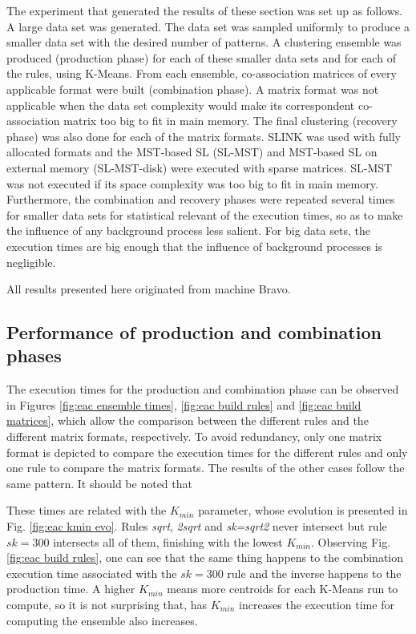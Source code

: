 The experiment that generated the results of these section was set up as follows.
A large data set was generated.
The data set was sampled uniformly to produce a smaller data set with the desired number of patterns.
A clustering ensemble was produced (production phase) for each of these smaller data sets and for each of the rules, using K-Means.
From each ensemble, co-association matrices of every applicable format were built (combination phase).
A matrix format was not applicable when the data set complexity would make its correspondent co-association matrix too big to fit in main memory.
The final clustering (recovery phase) was also done for each of the matrix formats.
SLINK was used with fully allocated formats and the MST-based SL (SL-MST) and MST-based SL on external memory (SL-MST-disk) were executed with sparse matrices.
SL-MST was not executed if its space complexity was too big to fit in main memory.
Furthermore, the combination and recovery phases were repeated several times for smaller data sets for statistical relevant of the execution times, so as to make the influence of any background process less salient.
For big data sets, the execution times are big enough that the influence of background processes is negligible.

All results presented here originated from machine Bravo.

\subsection{Performance of production and combination phases}

The execution times for the production and combination phase can be observed in Figures \ref{fig:eac ensemble times}, \ref{fig:eac build rules} and \ref{fig:eac build matrices}, which allow the comparison between the different rules and the different matrix formats, respectively.
To avoid redundancy, only one matrix format is depicted to compare the execution times for the different rules and only one rule to compare the matrix formats.
The results of the other cases follow the same pattern.
It should be noted that 

These times are related with the $K_{min}$ parameter, whose evolution is presented in Fig. \ref{fig:eac kmin evo}.
Rules \emph{sqrt}, \emph{2sqrt} and \emph{sk=sqrt2} never intersect but rule $sk=300$ intersects all of them, finishing with the lowest $K_{min}$.
Observing Fig. \ref{fig:eac build rules}, one can see that the same thing happens to the combination execution time associated with the $sk=300$ rule and the inverse happens to the production time.
A higher $K_{min}$ means more centroids for each K-Means run to compute, so it is not surprising that, has $K_{min}$ increases the execution time for computing the ensemble also increases.

